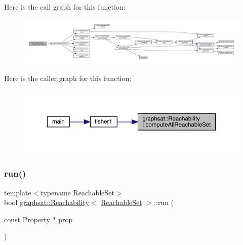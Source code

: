Here is the call graph for this function\+:
\nopagebreak
\begin{figure}[H]
\begin{center}
\leavevmode
\includegraphics[width=350pt]{classgraphsat_1_1_reachability_a1fc3182356898a032d6dfac91e302b71_cgraph}
\end{center}
\end{figure}
Here is the caller graph for this function\+:
\nopagebreak
\begin{figure}[H]
\begin{center}
\leavevmode
\includegraphics[width=350pt]{classgraphsat_1_1_reachability_a1fc3182356898a032d6dfac91e302b71_icgraph}
\end{center}
\end{figure}
\mbox{\label{classgraphsat_1_1_reachability_a183579baabbe4b26c93a0887d8460d3c}} 
\subsubsection{\texorpdfstring{run()}{run()}}
{\footnotesize\ttfamily template$<$typename Reachable\+Set$>$ \\
bool \mbox{\hyperlink{classgraphsat_1_1_reachability}{graphsat\+::\+Reachability}}$<$ \mbox{\hyperlink{classgraphsat_1_1_reachable_set}{Reachable\+Set}} $>$\+::run (\begin{DoxyParamCaption}\item[{const \mbox{\hyperlink{classgraphsat_1_1_property}{Property}} $\ast$}]{prop }\end{DoxyParamCaption})\hspace{0.3cm}{\ttfamily [inline]}}


